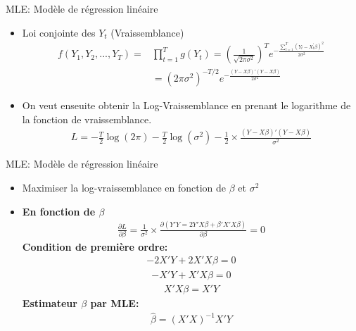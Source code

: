 \documentclass{beamer}
\begin{document}
\begin{frame}{MLE: Modèle de régression linéaire}
\begin{itemize}
\item Loi conjointe des $Y_t$ (Vraissemblance)
\begin{align*}
f(Y_1,Y_2,...,Y_T)=&\prod_{t=1}^{T}g(Y_t)=\left(\frac{1}{\sqrt{2 \pi \sigma^2}}\right)^T e^{-\frac{\sum_{t=1}^T(Y_t-X_t^{'} \beta)^2}{2 \sigma^2}} \\ & = (2 \pi \sigma^2)^{-T/2} e^{-\frac{(Y-X \beta)'(Y-X \beta)}{2\sigma^2}}
\end{align*}
\item On veut enseuite obtenir la Log-Vraissemblance en prenant le logarithme de la fonction de vraissemblance.
\begin{align*}
L= -\frac{T}{2} \log (2 \pi) -\frac{T}{2} \log (\sigma^2)-\frac{1}{2} \times \frac{(Y-X \beta)'(Y-X \beta)}{\sigma^2}
\end{align*}
\end{itemize}
\end{frame}

\begin{frame}{MLE: Modèle de régression linéaire}
\begin{itemize}
\item Maximiser la log-vraissemblance en fonction de $\beta$ et $\sigma^2$
\item \textbf{En fonction de $\beta$}
\begin{align*}
\frac{\partial L}{\partial \beta} = \frac{1}{\sigma^2} \times \frac{\partial (Y'Y =2Y'X\beta +\beta'X'X \beta)}{\partial \beta}=0
\end{align*}
\textbf{Condition de première ordre:}
\begin{align*}
-2X'Y+2X'X\beta=0
\end{align*}
\begin{align*}
-X'Y+X'X\beta=0
\end{align*}
\begin{align*}
X'X\beta = X'Y 
\end{align*}
\textbf{Estimateur $\beta$ par MLE:}
\begin{align*}
\hat{\beta}= (X'X)^{-1}X'Y
\end{align*}
\end{itemize}
\end{frame}
\end{document}
